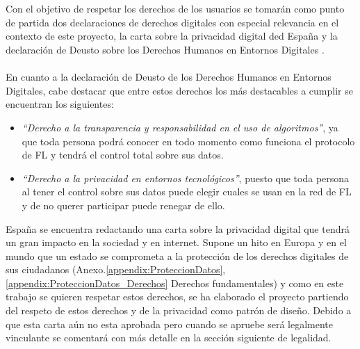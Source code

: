 \\\\
Con el objetivo de respetar los derechos de los usuarios se tomarán como punto de partida dos declaraciones de derechos digitales con especial relevancia en el contexto de este proyecto, la carta sobre la privacidad digital ded España \autocite{CartaDerechosDigitales} y la declaración de Deusto sobre los Derechos Humanos en Entornos Digitales \autocite{DeclaracionDeustoDerechos}.
\\\\
En cuanto a la declaración de Deusto de los Derechos Humanos en Entornos Digitales, cabe destacar que entre estos derechos los más destacables a cumplir se encuentran los siguientes:
\begin{itemize}
    \item \textit{``Derecho a la transparencia y responsabilidad en el uso de algoritmos''}, ya que toda persona podrá conocer en todo momento como funciona el protocolo de FL y tendrá el control total sobre sus datos.
    \item  \textit{``Derecho a la privacidad en entornos tecnológicos''}, puesto que toda persona al tener el control sobre sus datos puede elegir cuales se usan en la red de FL y de no querer participar puede renegar de ello.
\end{itemize}

España se encuentra redactando una carta sobre la privacidad digital que tendrá un gran impacto en la sociedad y en internet. Supone un hito en Europa y en el mundo que un estado se comprometa a la protección de los derechos digitales de sus ciudadanos (Anexo.\ref{appendix:ProteccionDatos}, \ref{appendix:ProteccionDatos_Derechos} Derechos fundamentales) y como en este trabajo se quieren respetar estos derechos, se ha elaborado el proyecto partiendo del respeto de estos derechos y de la privacidad como patrón de diseño. Debido a que esta carta aún no esta aprobada pero cuando se apruebe será legalmente vinculante se comentará con más detalle en la sección siguiente de legalidad.

